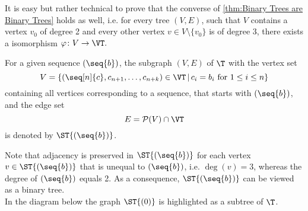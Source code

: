 \begin{rem}
It is easy but rather technical to prove that the converse of \cref{thm:Binary Trees are Binary Trees} holds as well, i.e. for every tree $(V,E)$, such that $V$ contains a vertex $v_0$ of degree 2 and every other vertex $v\in V\setminus\lbrace v_0\rbrace$ is of degree 3, there exists a isomorphism $\varphi\colon V\to\VT.$ 
\end{rem}

\begin{defin}
For a given sequence $(\seq{b})$, the subgraph $(V,E)$ of $\T$ with the vertex set 
\begin{equation*}
V=\left\lbrace (\seq[n]{c},c_{n+1},\ldots,c_{n+k})\in\VT \,\middle\vert\, c_i=b_i \text{ for } 1\leq i\leq n\right\rbrace
\end{equation*}
containing all vertices corresponding to a sequence, that starts with $(\seq{b})$, and the edge set
\begin{equation*}
E=\mathcal{P}(V)\cap \VT
\end{equation*}
is denoted by $\ST{(\seq{b})}$.
\end{defin}

Note that adjacency is preserved in $\ST{(\seq{b})}$ for each vertex $v\in\ST{(\seq{b})}$ that is unequal to $(\seq{b})$, i.e. $\deg(v)=3$, whereas the degree of $(\seq{b})$ equals 2. As a consequence, $\ST{(\seq{b})}$ can be viewed as a binary tree.\\
In the diagram below the graph $\ST{(0)}$ is highlighted as a subtree of $\T$.

\begin{center}
\endpgfgraphicnamed
\end{center}

